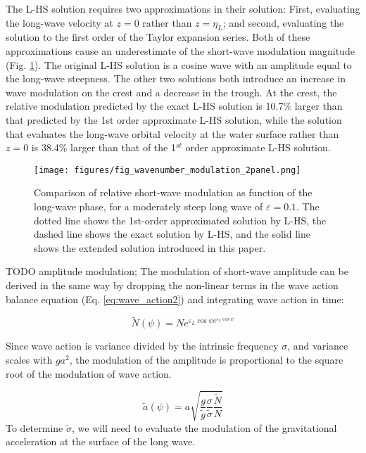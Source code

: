 \documentclass[draft]{agujournal2019}
\begin{document}
The L-HS solution requires two approximations in their solution:
First, evaluating the long-wave velocity at $z = 0$
rather than $z = \eta_L$; and second, evaluating the solution to the first order
of the Taylor expansion series.
Both of these approximations cause an underestimate of the short-wave
modulation magnitude (Fig. \ref{fig:wavenumber_modulation}).
The original L-HS solution is a cosine wave with an amplitude equal
to the long-wave steepness.
The other two solutions both introduce an increase in wave modulation
on the crest and a decrease in the trough.
At the crest, the relative modulation predicted by the exact L-HS solution
is 10.7\% larger than that predicted by the 1st order approximate L-HS
solution, while the solution that evaluates the long-wave orbital velocity
at the water surface rather than $z = 0$ is 38.4\% larger than that of the
1$^{st}$ order approximate L-HS solution.

\begin{figure}[h]
\label{fig:wavenumber_modulation}
\centering
\texttt{[image: figures/fig\_wavenumber\_modulation\_2panel.png]}
\caption{
  Comparison of relative short-wave modulation as function of the
  long-wave phase, for a moderately steep long wave of $\varepsilon = 0.1$.
  The dotted line shows the 1st-order approximated solution by L-HS,
  the dashed line shows the exact solution by L-HS,
  and the solid line shows the extended solution introduced in this paper.
}
\end{figure}

TODO amplitude modulation;
The modulation of short-wave amplitude can be derived in the same way by
dropping the non-linear terms in the wave action balance equation
(Eq. \ref{eq:wave_action2}) and integrating wave action in time:

\begin{equation}
\label{eq:wave_action_modulation}
\widetilde{N}(\psi) = N e^{\varepsilon_L \cos{\psi} e^{\varepsilon_L \cos{\psi}}}
\end{equation}

Since wave action is variance divided by the intrinsic frequency $\sigma$,
and variance scales with $ga^2$, the modulation of the amplitude is proportional
to the square root of the modulation of wave action.

\begin{equation}
\label{eq:wave_amplitude_modulation}
\widetilde{a}(\psi) = a \sqrt{
  \dfrac{g}{\widetilde{g}}
  \dfrac{\sigma}{\widetilde{\sigma}}
  \dfrac{\widetilde{N}}{N}}
\end{equation}
To determine $\widetilde{\sigma}$, we will need to evaluate the modulation of
the gravitational acceleration at the surface of the long wave.
\end{document}
